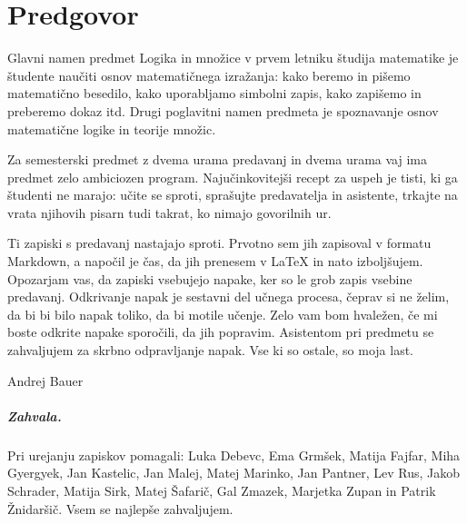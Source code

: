 \chapter*{Predgovor}
\label{chap:predgovor}

Glavni namen predmet Logika in množice v prvem letniku študija matematike je študente
naučiti osnov matematičnega izražanja: kako beremo in pišemo matematično besedilo, kako
uporabljamo simbolni zapis, kako zapišemo in preberemo dokaz itd. Drugi poglavitni namen
predmeta je spoznavanje osnov matematične logike in teorije množic.

Za semesterski predmet z dvema urama predavanj in dvema urama vaj ima predmet zelo
ambiciozen program. Najučinkovitejši recept za uspeh je tisti, ki ga študenti ne marajo:
učite se sproti, sprašujte predavatelja in asistente, trkajte na vrata njihovih pisarn
tudi takrat, ko nimajo govorilnih ur.

Ti zapiski s predavanj nastajajo sproti. Prvotno sem jih zapisoval v formatu Markdown, a napočil je čas, da jih prenesem v {\LaTeX} in nato izboljšujem. Opozarjam vas, da zapiski vsebujejo napake, ker so le grob zapis vsebine predavanj. Odkrivanje napak je sestavni del učnega procesa, čeprav si ne želim, da bi bi bilo napak toliko, da bi motile učenje. Zelo vam bom hvaležen, če mi boste odkrite napake sporočili, da jih popravim. Asistentom pri predmetu se zahvaljujem za skrbno odpravljanje napak. Vse ki so ostale, so moja last.

\bigskip

\begin{flushright}
Andrej Bauer \qquad\hbox{}
\end{flushright}

\bigskip

\paragraph{Zahvala.}
%
Pri urejanju zapiskov pomagali:
%
Luka Debevc,
Ema Grmšek,
Matija Fajfar,
Miha Gyergyek,
Jan Kastelic,
Jan Malej,
Matej Marinko,
Jan Pantner,
Lev Rus,
Jakob Schrader,
Matija Sirk,
Matej Šafarič,
Gal Zmazek,
Marjetka Zupan in Patrik Žnidaršič.
%
Vsem se najlepše zahvaljujem.


